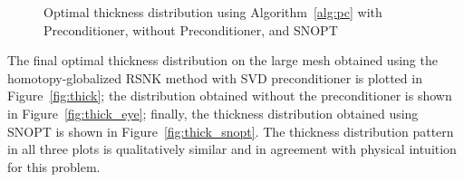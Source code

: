 \begin{figure}[tbp]
  \centering
  \hspace{1em}
  \hspace{1em}
    \caption{Optimal thickness distribution using Algorithm~\ref{alg:pc} with Preconditioner, without Preconditioner, and SNOPT \label{fig:thick3}}
\end{figure}
    
The final optimal thickness distribution on the large mesh obtained using the homotopy-globalized RSNK method with SVD preconditioner is plotted in Figure~\ref{fig:thick}; the distribution obtained without the preconditioner is shown in Figure~\ref{fig:thick_eye}; finally, the thickness distribution obtained using SNOPT is shown in Figure~\ref{fig:thick_snopt}. 
The thickness distribution pattern in all three plots is qualitatively similar and in agreement with physical
intuition for this problem. 

